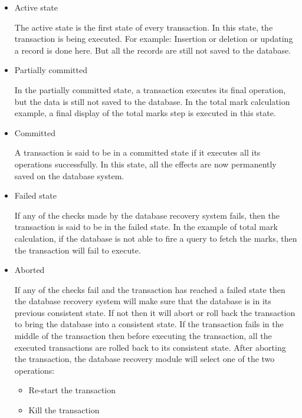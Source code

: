 \documentclass{article}
\begin{document}
\begin{itemize}

\item Active state

The active state is the first state of every transaction. In this state, the transaction is being executed.
For example: Insertion or deletion or updating a record is done here. But all the records are still not saved to the database.

\item Partially committed

In the partially committed state, a transaction executes its final operation, but the data is still not saved to the database.
In the total mark calculation example, a final display of the total marks step is executed in this state.

\item Committed

A transaction is said to be in a committed state if it executes all its operations successfully. In this state, all the effects are now permanently saved on the database system.

\item Failed state

If any of the checks made by the database recovery system fails, then the transaction is said to be in the failed state.
In the example of total mark calculation, if the database is not able to fire a query to fetch the marks, then the transaction will fail to execute.

\item Aborted

If any of the checks fail and the transaction has reached a failed state then the database recovery system will make sure that the database is in its previous consistent state. If not then it will abort or roll back the transaction to bring the database into a consistent state.
If the transaction fails in the middle of the transaction then before executing the transaction, all the executed transactions are rolled back to its consistent state.
After aborting the transaction, the database recovery module will select one of the two operations:
\begin{itemize}
\item Re-start the transaction
\item Kill the transaction
\end{itemize}

\end{itemize}
\end{document}
